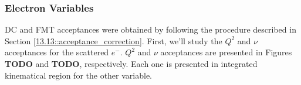 \subsubsection{Electron Variables}
\label{14.21::electron_variables}
    DC and FMT acceptances were obtained by following the procedure described in Section \ref{13.13::acceptance_correction}.
    First, we'll study the $Q^2$ and $\nu$ acceptances for the scattered $e^-$.
    $Q^2$ and $\nu$ acceptances are presented in Figures \textbf{TODO} and \textbf{TODO}, respectively.
    Each one is presented in integrated kinematical region for the other variable.

